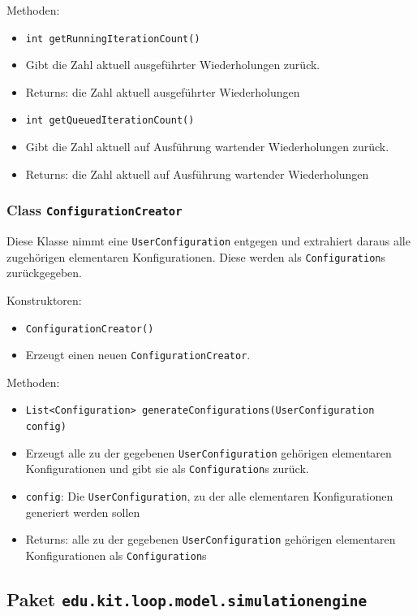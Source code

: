 \documentclass[parskip=full,11pt]{scrartcl}
\begin{document}
Methoden:
\begin{itemize}\itemsep -10pt
\item \texttt{int getRunningIterationCount()}
\item[] Gibt die Zahl aktuell ausgeführter Wiederholungen zurück.
\item[] Returns: die Zahl aktuell ausgeführter Wiederholungen

\item \texttt{int getQueuedIterationCount()}
\item[] Gibt die Zahl aktuell auf Ausführung wartender Wiederholungen zurück.
\item[] Returns: die Zahl aktuell auf Ausführung wartender Wiederholungen
\end{itemize}

\subsubsection{Class \texttt{ConfigurationCreator}}
Diese Klasse nimmt eine \texttt{UserConfiguration} entgegen und extrahiert daraus alle zugehörigen elementaren Konfigurationen. Diese werden als \texttt{Configuration}s zurückgegeben.

Konstruktoren:
\begin{itemize}\itemsep -10pt
\item \texttt{ConfigurationCreator()}
\item[] Erzeugt einen neuen \texttt{ConfigurationCreator}.
\end{itemize}

Methoden:
\begin{itemize}\itemsep -10pt
\item \texttt{List<Configuration> generateConfigurations(UserConfiguration config)}
\item[] Erzeugt alle zu der gegebenen \texttt{UserConfiguration} gehörigen elementaren Konfigurationen und gibt sie als \texttt{Configuration}s zurück.
\item[] \texttt{config}: Die \texttt{UserConfiguration}, zu der alle elementaren Konfigurationen generiert werden sollen
\item[] Returns: alle zu der gegebenen \texttt{UserConfiguration} gehörigen elementaren Konfigurationen als \texttt{Configuration}s
\end{itemize}

\subsection{Paket \texttt{edu.kit.loop.model.simulationengine}}
\end{document}
